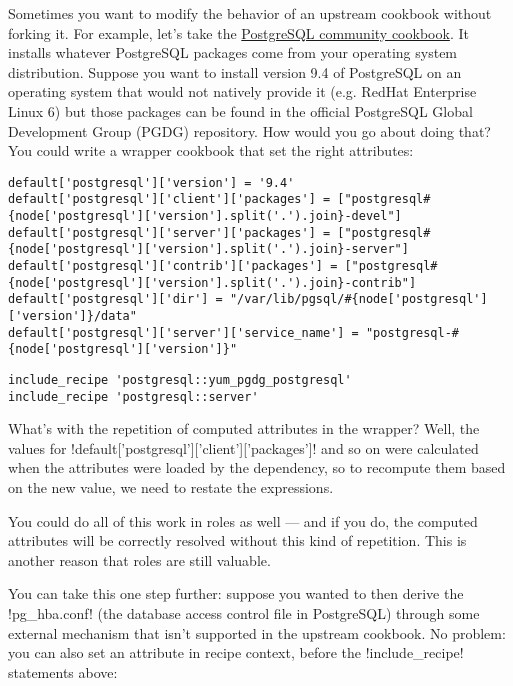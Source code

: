 Sometimes you want to modify the behavior of an upstream cookbook without forking it. For example, let's take the \href{https://supermarket.getchef.com/cookbooks/postgresql}{PostgreSQL community cookbook}. It installs whatever PostgreSQL packages come from your operating system distribution. Suppose you want to install version 9.4 of PostgreSQL on an operating system that would not natively provide it (e.g. RedHat Enterprise Linux 6) but those packages can be found in the official PostgreSQL Global Development Group (PGDG) repository. How would you go about doing that? You could write a wrapper cookbook that set the right attributes:

\begin{lstlisting}[label=lst:wrapper-cookbook3,caption=acmeco-postgresql/attributes/default.rb]
default['postgresql']['version'] = '9.4'
default['postgresql']['client']['packages'] = ["postgresql#{node['postgresql']['version'].split('.').join}-devel"]
default['postgresql']['server']['packages'] = ["postgresql#{node['postgresql']['version'].split('.').join}-server"]
default['postgresql']['contrib']['packages'] = ["postgresql#{node['postgresql']['version'].split('.').join}-contrib"]
default['postgresql']['dir'] = "/var/lib/pgsql/#{node['postgresql']['version']}/data"
default['postgresql']['server']['service_name'] = "postgresql-#{node['postgresql']['version']}"
\end{lstlisting}

\begin{lstlisting}[label=lst:wrapper-cookbook4,caption=acmeco-postgresql/recipes/default.rb]
include_recipe 'postgresql::yum_pgdg_postgresql'
include_recipe 'postgresql::server'
\end{lstlisting}

What's with the repetition of computed attributes in the wrapper? Well, the values for \inline!default['postgresql']['client']['packages']! and so on were calculated when the attributes were loaded by the dependency, so to recompute them based on the new value, we need to restate the expressions.

You could do all of this work in roles as well — and if you do, the computed attributes will be correctly resolved without this kind of repetition. This is another reason that roles are still valuable.

You can take this one step further: suppose you wanted to then derive the \inline!pg_hba.conf! (the database access control file in PostgreSQL) through some external mechanism that isn't supported in the upstream cookbook. No problem: you can also set an attribute in recipe context, before the \inline!include_recipe! statements above:

